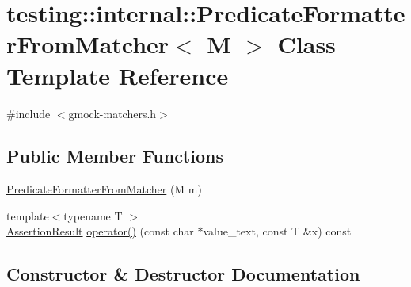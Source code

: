 \hypertarget{classtesting_1_1internal_1_1_predicate_formatter_from_matcher}{}\section{testing\+:\+:internal\+:\+:Predicate\+Formatter\+From\+Matcher$<$ M $>$ Class Template Reference}
\label{classtesting_1_1internal_1_1_predicate_formatter_from_matcher}


{\ttfamily \#include $<$gmock-\/matchers.\+h$>$}

\subsection*{Public Member Functions}
\begin{DoxyCompactItemize}
\item 
\hyperlink{classtesting_1_1internal_1_1_predicate_formatter_from_matcher_aa0c40eca009c31e25738520dea0bc98c}{Predicate\+Formatter\+From\+Matcher} (M m)
\item 
{\footnotesize template$<$typename T $>$ }\\\hyperlink{classtesting_1_1_assertion_result}{Assertion\+Result} \hyperlink{classtesting_1_1internal_1_1_predicate_formatter_from_matcher_a51d28bee5f86347ea34b7a0f2758b599}{operator()} (const char $\ast$value\+\_\+text, const T \&x) const
\end{DoxyCompactItemize}


\subsection{Constructor \& Destructor Documentation}
\mbox{\label{classtesting_1_1internal_1_1_predicate_formatter_from_matcher_aa0c40eca009c31e25738520dea0bc98c}} 
